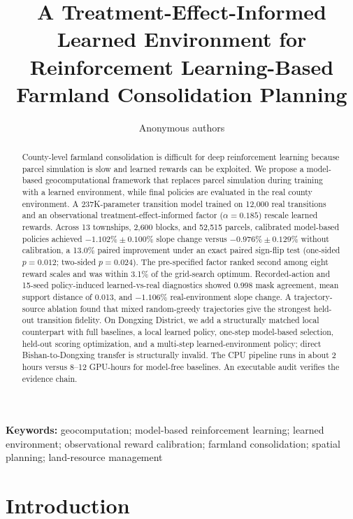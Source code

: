 \documentclass[11pt]{article}
\begin{document}
\title{A Treatment-Effect-Informed Learned Environment for Reinforcement Learning-Based Farmland Consolidation Planning}

\author{Anonymous authors}

\date{}
\maketitle

\begin{abstract}
County-level farmland consolidation is difficult for deep reinforcement learning because parcel simulation is slow and learned rewards can be exploited. We propose a model-based geocomputational framework that replaces parcel simulation during training with a learned environment, while final policies are evaluated in the real county environment. A 237K-parameter transition model trained on 12{,}000 real transitions and an observational treatment-effect-informed factor ($\alpha=0.185$) rescale learned rewards. Across 13 townships, 2{,}600 blocks, and 52{,}515 parcels, calibrated model-based policies achieved $-1.102\% \pm 0.100\%$ slope change versus $-0.976\% \pm 0.129\%$ without calibration, a 13.0\% paired improvement under an exact paired sign-flip test (one-sided $p=0.012$; two-sided $p=0.024$). The pre-specified factor ranked second among eight reward scales and was within 3.1\% of the grid-search optimum. Recorded-action and 15-seed policy-induced learned-vs-real diagnostics showed 0.998 mask agreement, mean support distance of 0.013, and $-1.106\%$ real-environment slope change. A trajectory-source ablation found that mixed random-greedy trajectories give the strongest held-out transition fidelity. On Dongxing District, we add a structurally matched local counterpart with full baselines, a local learned policy, one-step model-based selection, held-out scoring optimization, and a multi-step learned-environment policy; direct Bishan-to-Dongxing transfer is structurally invalid. The CPU pipeline runs in about 2 hours versus 8--12 GPU-hours for model-free baselines. An executable audit verifies the evidence chain.
\end{abstract}

\noindent\textbf{Keywords:} geocomputation; model-based reinforcement learning; learned environment; observational reward calibration; farmland consolidation; spatial planning; land-resource management


\section{Introduction}
\label{sec:intro}
\end{document}
